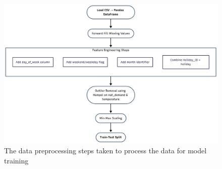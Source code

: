 \appendix 
\chapter{\label{sec:appendixA}}
\begin{figure}[htbp]
	\centering %
	\includegraphics[scale=0.1]{Chapters/images/preprocess.png}
	\caption{The data preprocessing steps taken to process the data for model training}
	\label{fig:preprocessing_steps_flowchart} %
\end{figure}


